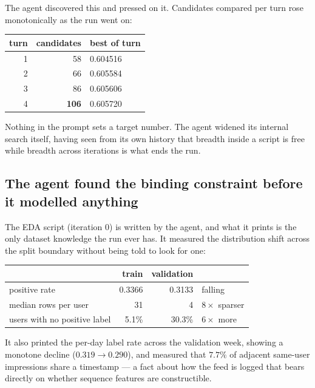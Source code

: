 \documentclass[11pt,a4paper]{article}
\begin{document}
The agent discovered this and pressed on it. Candidates compared per turn rose monotonically as
the run went on:

\begin{center}
\small
\begin{tabular}{@{}rrl@{}}
\toprule
\textbf{turn} & \textbf{candidates} & \textbf{best of turn} \\
\midrule
1 & 58  & 0.604516 \\
2 & 66  & 0.605584 \\
3 & 86  & 0.605606 \\
4 & \textbf{106} & 0.605720 \\
\bottomrule
\end{tabular}
\end{center}

\noindent
Nothing in the prompt sets a target number. The agent widened its internal search itself,
having seen from its own history that breadth inside a script is free while breadth across
iterations is what ends the run.

\subsection{The agent found the binding constraint before it modelled anything}

The EDA script (iteration 0) is written by the agent, and what it prints is the only dataset
knowledge the run ever has. It measured the distribution shift across the split boundary
without being told to look for one:

\begin{center}
\small
\begin{tabular}{@{}lrrl@{}}
\toprule
 & \textbf{train} & \textbf{validation} & \\
\midrule
positive rate                & 0.3366 & 0.3133 & falling \\
median rows per user         & 31     & 4      & $8\times$ sparser \\
users with no positive label & 5.1\%  & 30.3\% & $6\times$ more \\
\bottomrule
\end{tabular}
\end{center}

\noindent
It also printed the per-day label rate across the validation week, showing a monotone decline
($0.319 \to 0.290$), and measured that $7.7\%$ of adjacent same-user impressions share a
timestamp --- a fact about how the feed is logged that bears directly on whether sequence
features are constructible.
\end{document}
